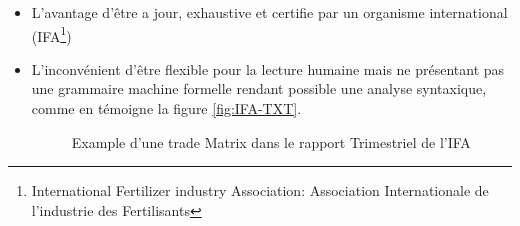 		\begin{itemize}
		\item L'avantage d’être a jour, exhaustive et certifie par un organisme international (IFA\footnote{International Fertilizer industry Association: Association Internationale de l'industrie des Fertilisants})
		\item L’inconvénient d’être flexible pour la lecture humaine mais ne présentant pas une grammaire machine formelle rendant possible une analyse syntaxique, comme en témoigne la figure \ref{fig:IFA-TXT}.
			\begin{figure}[H]
			    		\raggedright
			    		\caption{Example d'une trade Matrix dans le rapport Trimestriel de l'IFA}
			    		\label{fig:IFA-PDF}
			\end{figure}	
		\end{itemize}
		
